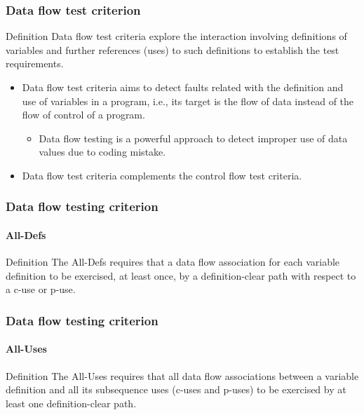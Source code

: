 \begin{frame}[parent={cmap:structural-software-testing},hasnext=true,hasprev=true]
\frametitle{Data flow test criterion}
\label{concept:data-flow-test}
\label{concept:data-flow-test-criterion}

\begin{block:concept}{Definition}
Data flow test criteria explore the interaction involving definitions of
variables and further references (uses) to such definitions to establish the
test requirements.
\end{block:concept}


\begin{block:fact}{}
\begin{itemize}
    \item Data flow test criteria aims to detect faults related with
	the definition and use of variables in a program, i.e., its target is the
	flow of data instead of the flow of control of a program.
	\begin{itemize}
		\item Data flow testing is a powerful approach to detect improper use
		of data values due to coding mistake.
	\end{itemize}

	\item Data flow test criteria complements the control flow test criteria.
\end{itemize}
\end{block:fact}
\end{frame}



\begin{frame}
\frametitle{Data flow testing criterion}
\framesubtitle{All-Defs}
\label{concept:all-defs}
\label{concept:all-defs-criterion}

\begin{block:concept}{Definition}
The All-Defs requires that a data flow association for each variable
definition to be exercised, at least once, by a definition-clear path with
respect to a c-use or p-use.
\end{block:concept}
\end{frame}


\begin{frame}
\label{concept:all-uses}
\label{concept:all-uses-criterion}
\frametitle{Data flow testing criterion}
\framesubtitle{All-Uses}

\begin{block:concept}{Definition}
The All-Uses requires that all data flow associations between a
variable definition and all its subsequence uses (c-uses and p-uses) to be
exercised by at least one definition-clear path.
\end{block:concept}

\hfill
{}

\end{frame}




